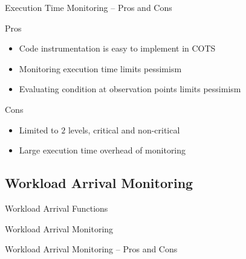 \begin{frame}{Execution Time Monitoring -- Pros and Cons}

\begin{block}{Pros}
\begin{itemize}
    \item<2-> Code instrumentation is easy to implement in COTS
    \item<3-> Monitoring execution time limits pessimism
    \item<4-> Evaluating condition at observation points limits pessimism
\end{itemize}
\end{block}

\vfill

\begin{block}{Cons}
\begin{itemize}
    \item<5-> Limited to $2$ levels, critical and non-critical
    \item<6-> Large execution time overhead of monitoring
\end{itemize}
\end{block}

\end{frame}


\subsection{Workload Arrival Monitoring}

\begin{frame}{Workload Arrival Functions}

\end{frame}

\begin{frame}{Workload Arrival Monitoring}

\end{frame}


\begin{frame}{Workload Arrival Monitoring -- Pros and Cons}

\end{frame}

